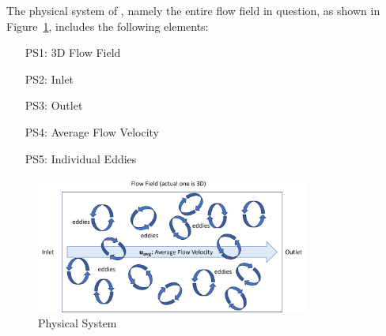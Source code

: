 \documentclass[12pt]{article}
\begin{document}

The physical system of \progname{}, namely the entire flow field in question, as shown in Figure~\ref{Fig_PhysicalSystem},
includes the following elements:

\begin{itemize}

\item[PS1:] 3D Flow Field
\item[PS2:] Inlet
\item[PS3:] Outlet
\item[PS4:] Average Flow Velocity
\item[PS5:] Individual Eddies

\end{itemize}

\begin{figure}[h!]
  \begin{center}
   \includegraphics[width=0.8\textwidth]{PS.png}
  \caption{Physical System}
  \label{Fig_PhysicalSystem} 
  \end{center}
\end{figure}
\end{document}
